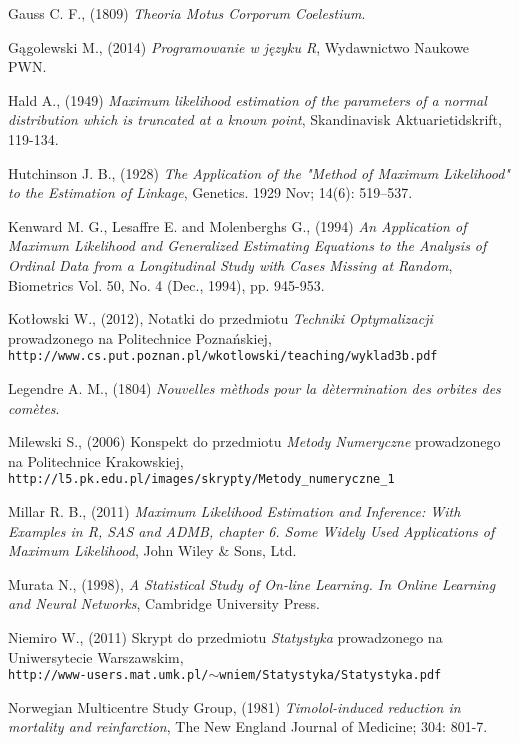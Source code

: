 \begin{thebibliography}{99}
 Gauss C. F., (1809) \textit{Theoria Motus Corporum Coelestium}.

 Gągolewski M., (2014) \textit{Programowanie w języku R}, Wydawnictwo Naukowe PWN.


 Hald A., (1949) \textit{Maximum likelihood estimation of the parameters of a normal distribution which is truncated at a known point}, Skandinavisk Aktuarietidskrift, 119-134.

 Hutchinson J. B., (1928) \textit{The Application of the "Method of Maximum Likelihood" to the Estimation of Linkage}, Genetics. 1929 Nov; 14(6): 519–537.


 Kenward M. G., Lesaffre E. and Molenberghs G., (1994) \textit{An Application of Maximum Likelihood and Generalized Estimating Equations to the Analysis of Ordinal Data from a Longitudinal Study with Cases Missing at Random}, Biometrics
Vol. 50, No. 4 (Dec., 1994), pp. 945-953.

 Kotłowski W., (2012), Notatki do przedmiotu \textit{Techniki Optymalizacji} prowadzonego na Politechnice Poznańskiej, \\ \texttt{http://www.cs.put.poznan.pl/wkotlowski/teaching/wyklad3b.pdf}

 Legendre A. M., (1804) \textit{Nouvelles m\`ethods pour la d\`etermination des orbites des com\`etes}.

 Milewski S., (2006) Konspekt do przedmiotu \textit{Metody Numeryczne} prowadzonego na Politechnice Krakowskiej, \\ \texttt{http://l5.pk.edu.pl/images/skrypty/Metody\_numeryczne\_1}

 Millar R. B., (2011) \textit{Maximum Likelihood Estimation and Inference: With Examples in R, SAS and ADMB, chapter 6. Some Widely Used Applications of Maximum Likelihood}, John Wiley \& Sons, Ltd.

 Murata N., (1998), \textit{A Statistical Study of On-line Learning. In Online Learning
and Neural Networks}, Cambridge University Press.

 Niemiro W., (2011) Skrypt do przedmiotu \textit{Statystyka} prowadzonego na Uniwersytecie Warszawskim, \\ \texttt{http://www-users.mat.umk.pl/$\sim$wniem/Statystyka/Statystyka.pdf}

 Norwegian Multicentre Study Group, (1981) \textit{Timolol-induced reduction in
mortality and reinfarction}, The New England  Journal of Medicine; 304: 801-7.



\end{thebibliography}
